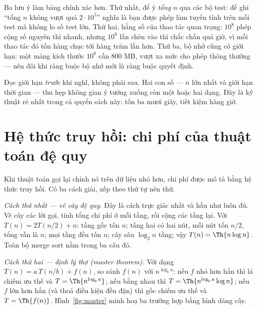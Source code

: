 \documentclass[../../algorithm.tex]{subfiles}
\begin{document}
Ba lưu ý làm bảng chính xác hơn. Thứ nhất, để ý \emph{tổng} \(n\) qua các bộ test: đề ghi ``tổng \(n\) không vượt quá \(2\cdot10^5\)'' nghĩa là bạn được phép làm tuyến tính trên mỗi test mà không lo số test lớn. Thứ hai, hằng số của thao tác quan trọng: \(10^8\) phép cộng số nguyên thì nhanh, nhưng \(10^8\) lần chèn vào  thì chắc chắn quá giờ, vì mỗi thao tác đó tốn hàng chục tới hàng trăm lần hơn. Thứ ba, bộ nhớ cũng có giới hạn: một mảng  kích thước \(10^8\) cần 800 MB, vượt xa mức cho phép thông thường --- nên đôi khi ràng buộc bộ nhớ mới là ràng buộc quyết định.

\begin{cannho}
Đọc giới hạn \emph{trước} khi nghĩ, không phải sau. Hai con số --- \(n\) lớn nhất và giới hạn thời gian --- thu hẹp không gian ý tưởng xuống còn một hoặc hai dạng. Đây là kỹ thuật rẻ nhất trong cả quyển sách này: tốn ba mươi giây, tiết kiệm hàng giờ.
\end{cannho}

\section{Hệ thức truy hồi: chi phí của thuật toán đệ quy}

Khi thuật toán gọi lại chính nó trên dữ liệu nhỏ hơn, chi phí được mô tả bằng hệ thức truy hồi. Có ba cách giải, xếp theo thứ tự nên thử.

\emph{Cách thứ nhất --- vẽ cây đệ quy.} Đây là cách trực giác nhất và hầu như luôn đủ. Vẽ cây các lời gọi, tính tổng chi phí ở mỗi tầng, rồi cộng các tầng lại. Với \(T(n) = 2T(n/2) + n\): tầng gốc tốn \(n\); tầng hai có hai nút, mỗi nút tốn \(n/2\), tổng vẫn là \(n\); mọi tầng đều tốn \(n\); cây sâu \(\log_2 n\) tầng; vậy \(T(n) = \Th{n\log n}\). Toàn bộ merge sort nằm trong ba câu đó.

\emph{Cách thứ hai --- định lý thợ (master theorem).} Với dạng \(T(n) = a\,T(n/b) + f(n)\), so sánh \(f(n)\) với \(n^{\log_b a}\): nếu \(f\) nhỏ hơn hẳn thì lá chiếm ưu thế và \(T = \Th{n^{\log_b a}}\); nếu bằng nhau thì \(T = \Th{n^{\log_b a}\log n}\); nếu \(f\) lớn hơn hẳn (và thoả điều kiện đều đặn) thì gốc chiếm ưu thế và \(T = \Th{f(n)}\). Hình~\ref{fig:master} minh hoạ ba trường hợp bằng hình dáng cây.
\end{document}
